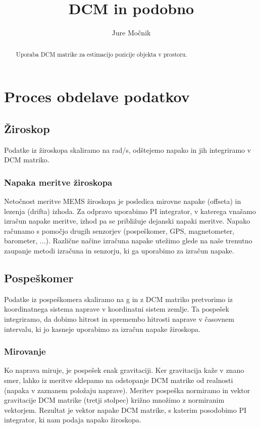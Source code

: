 \documentclass[]{article}
\title{DCM in podobno}
\author{Jure Močnik}
\begin{document}
\maketitle

\begin{abstract}
Uporaba DCM matrike za estimacijo pozicije objekta v prostoru.
\end{abstract}

\clearpage

\tableofcontents

\clearpage

\section{Proces obdelave podatkov}
\subsection{Žiroskop}
Podatke iz žiroskopa skaliramo na rad/s, odštejemo napako in jih integriramo v DCM matriko. 
\subsubsection{Napaka meritve žiroskopa}
Netočnost meritve MEMS žiroskopa je posledica mirovne napake (offseta) in lezenja (drifta) izhoda. Za odpravo uporabimo PI integrator, v katerega vnašamo izračun napake meritve, izhod pa se približuje dejanski napaki meritve. Napako računamo s pomočjo drugih senzorjev (pospeškomer, GPS, magnetometer, barometer, ...). Različne načine izračuna napake utežimo glede na naše trenutno zaupanje metodi izračuna in senzorju, ki ga uporabimo za izračun napake.

\subsection{Pospeškomer}
Podatke iz pospeškomera skaliramo na g in z DCM matriko pretvorimo iz koordinatnega sistema naprave v koordinatni sistem zemlje. Ta pospešek integriramo, da dobimo hitrost in spremembo hitrosti naprave v časovnem intervalu, ki jo kasneje uporabimo za izračun napake žiroskopa.

\subsubsection{Mirovanje}
Ko naprava miruje, je pospešek enak gravitaciji. Ker gravitacija kaže v znano smer, lahko iz meritve sklepamo na odstopanje DCM matrike od realnosti (napaka v zaznanem položaju naprave). 
Meritev pospeška normiramo in vektor gravitacije DCM matrike (tretji stolpec) križno množimo z normiranim vektorjem. Rezultat je vektor napake DCM matrike, s katerim posodobimo PI integrator, ki nam podaja napako žiroskopa.
\end{document}
